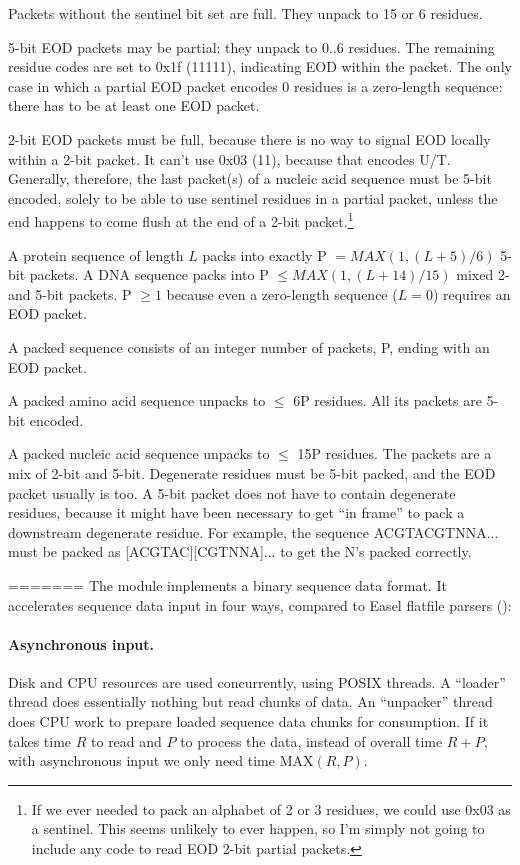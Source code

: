 Packets without the sentinel bit set are full. They unpack to 15 or 6
residues.
 
5-bit EOD packets may be partial: they unpack to 0..6 residues. The
remaining residue codes are set to 0x1f (11111), indicating EOD within
the packet. The only case in which a partial EOD packet encodes 0
residues is a zero-length sequence: there has to be at least one EOD
packet.

2-bit EOD packets must be full, because there is no way to signal EOD
locally within a 2-bit packet. It can't use 0x03 (11), because that
encodes U/T. Generally, therefore, the last packet(s) of a nucleic
acid sequence must be 5-bit encoded, solely to be able to use sentinel
residues in a partial packet, unless the end happens to come flush at
the end of a 2-bit packet.\footnote{If we ever needed to pack an
  alphabet of 2 or 3 residues, we could use 0x03 as a sentinel.  This
  seems unlikely to ever happen, so I'm simply not going to include
  any code to read EOD 2-bit partial packets.}

A protein sequence of length $L$ packs into exactly P $= MAX(1,
(L+5)/6)$ 5-bit packets. A DNA sequence packs into P $\leq MAX(1,
(L+14)/15)$ mixed 2- and 5-bit packets. P $\geq 1$ because even a
zero-length sequence ($L=0$) requires an EOD packet.

A packed sequence consists of an integer number of packets, P, ending
with an EOD packet.
 
A packed amino acid sequence unpacks to $\leq$ 6P residues. All its
packets are 5-bit encoded.
 
A packed nucleic acid sequence unpacks to $\leq$ 15P residues.  The
packets are a mix of 2-bit and 5-bit. Degenerate residues must be
5-bit packed, and the EOD packet usually is too. A 5-bit packet does
not have to contain degenerate residues, because it might have been
necessary to get ``in frame'' to pack a downstream degenerate
residue. For example, the sequence ACGTACGTNNA... must be packed as
[ACGTAC][CGTNNA]... to get the N's packed correctly.
 

=======
The  module implements a binary sequence data
format. It accelerates sequence data input in four ways, compared to
Easel flatfile parsers ():

\paragraph{Asynchronous input.}
   Disk and CPU resources are used concurrently, using POSIX threads.
   A ``loader'' thread does essentially nothing but read chunks of
   data.  An ``unpacker'' thread does CPU work to prepare loaded
   sequence data chunks for consumption. If it takes time $R$ to read
   and $P$ to process the data, instead of overall time $R+P$, with
   asynchronous input we only need time $\mathrm{MAX}(R,P)$.

